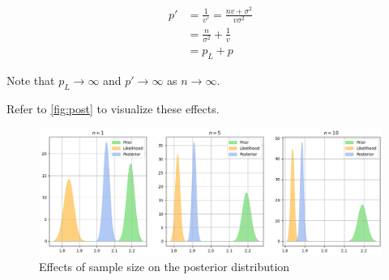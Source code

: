 \begin{align*}
  p' &= \frac{1}{v'} = \frac{n v + \sigma^2}{v \sigma^2} \\
  &= \frac{n}{\sigma^2} + \frac{1}{v} \\
  &= p_L + p
\end{align*}

\noindent Note that $p_L \to \infty$ and $p' \to \infty$ as $n \to \infty$.

Refer to \autoref{fig:post} to visualize these effects.

\begin{figure}[!ht]
  \centering
  \includegraphics[width=\textwidth]{images/posterior.png}
  \caption{Effects of sample size on the posterior distribution}
  \label{fig:post}
\end{figure}
